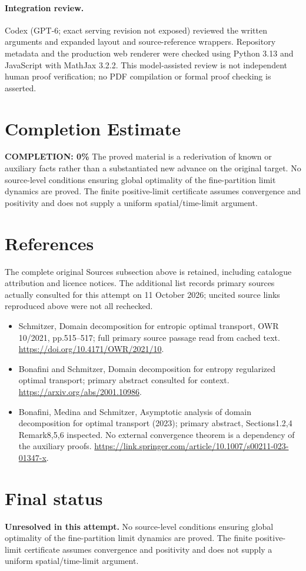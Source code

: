 \documentclass[11pt]{article}
\begin{document}
\paragraph{Integration review.} Codex (GPT-6; exact serving revision not exposed) reviewed the written arguments and expanded layout and source-reference wrappers. Repository metadata and the production web renderer were checked using Python 3.13 and JavaScript with MathJax 3.2.2. This model-assisted review is not independent human proof verification; no PDF compilation or formal proof checking is asserted.

\section{Completion Estimate}
\noindent\textbf{COMPLETION: 0\%}
The proved material is a rederivation of known or auxiliary facts rather than a substantiated new advance on the original target. No source-level conditions ensuring global optimality of the fine-partition limit dynamics are proved. The finite positive-limit certificate assumes convergence and positivity and does not supply a uniform spatial/time-limit argument.
\section{References}
The complete original Sources subsection above is retained, including catalogue attribution and licence notices. The additional list records primary sources actually consulted for this attempt on 11 October 2026; uncited source links reproduced above were not all rechecked.
\begin{itemize}
\item Schmitzer, Domain decomposition for entropic optimal transport, OWR 10/2021, pp.515–517; full primary source passage read from cached text. \url{https://doi.org/10.4171/OWR/2021/10}.
\item Bonafini and Schmitzer, Domain decomposition for entropy regularized optimal transport; primary abstract consulted for context. \url{https://arxiv.org/abs/2001.10986}.
\item Bonafini, Medina and Schmitzer, Asymptotic analysis of domain decomposition for optimal transport (2023); primary abstract, Sections1.2,4 Remark8,5,6 inspected. No external convergence theorem is a dependency of the auxiliary proofs. \url{https://link.springer.com/article/10.1007/s00211-023-01347-x}.
\end{itemize}
\section{Final status}
\textbf{Unresolved in this attempt.} No source-level conditions ensuring global optimality of the fine-partition limit dynamics are proved. The finite positive-limit certificate assumes convergence and positivity and does not supply a uniform spatial/time-limit argument.
\end{document}
